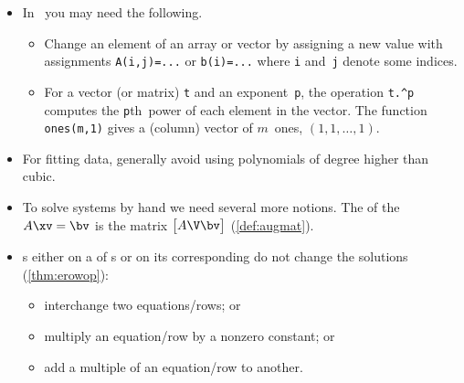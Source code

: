 \begin{itemize}
\itemhi \cref{pro:unisol} use \script\ to solve the matrix-vector system \(A\xv=\bv\), for a ~\(A\): 
\begin{enumerate}
\item form matrix~\(A\) and ~\(\bv\);
\item check \verb|rcond(A)| exists and is not too small, \(1\geq\text{good} >10^{-2} >\text{poor} >10^{-4} >\text{bad} >10^{-8} >\text{terrible}\);
\item if \verb|rcond(A)| is acceptable, then execute \verb|x=A\b| to compute the solution vector~\(\xv\). 
\end{enumerate}
Checking \verb|rcond()| avoids many mistakes in applications.


\item In \script\ you may need the following.
\begin{itemize}
\itemhi \verb|[ ... ; ... ; ... ]| forms both matrices and vectors, or use newlines instead of the semicolons.
\itemhi \verb|rcond(A)|  of a ~\(A\) \emph{estimates} the reciprocal of the so-called .
\itemhi \verb|x=A\b| computes an `answer' to \(A\xv=\bv\)\,---but it may not be a solution unless \verb|rcond(A)| exists and is not small;
\item Change an element of an array or vector by assigning a new value with assignments \verb|A(i,j)=...| or \verb|b(i)=...| where \verb|i| and~\verb|j| denote some indices.
\item For a vector (or matrix) \verb|t| and an exponent~\verb|p|, the operation \verb|t.^p| computes the \verb|p|th~power of each element in the vector.
\itemme The function \verb|ones(m,1)| gives a (column) vector of \(m\)~ones, \((1,1,\ldots,1)\).
\end{itemize}

\item For fitting data, generally avoid using polynomials of degree higher than cubic.


\item To solve systems by hand we need several more notions.
The  of the  \(A\xv=\bv\) is the matrix \(\begin{bmatrix} A\V \bv \end{bmatrix}\)  (\cref{def:augmat}).

\item {}s either on a  of s or on its corresponding  do not change the solutions (\cref{thm:erowop}):
\begin{itemize}
\item interchange two equations\slash rows; or
\item multiply an equation\slash row by a nonzero constant; or
\item add a multiple of an equation\slash row to another.
\end{itemize}


\end{itemize}
